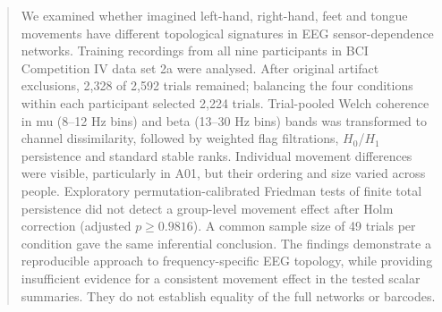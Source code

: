 \begin{abstract}
We examined whether imagined left-hand, right-hand, feet and tongue movements have different topological signatures in EEG sensor-dependence networks. Training recordings from all nine participants in BCI Competition IV data set 2a were analysed. After original artifact exclusions, 2,328 of 2,592 trials remained; balancing the four conditions within each participant selected 2,224 trials. Trial-pooled Welch coherence in mu (8--12 Hz bins) and beta (13--30 Hz bins) bands was transformed to channel dissimilarity, followed by weighted flag filtrations, $H_0$/$H_1$ persistence and standard stable ranks. Individual movement differences were visible, particularly in A01, but their ordering and size varied across people. Exploratory permutation-calibrated Friedman tests of finite total persistence did not detect a group-level movement effect after Holm correction (adjusted $p\geq0.9816$). A common sample size of 49 trials per condition gave the same inferential conclusion. The findings demonstrate a reproducible approach to frequency-specific EEG topology, while providing insufficient evidence for a consistent movement effect in the tested scalar summaries. They do not establish equality of the full networks or barcodes.
\end{abstract}
